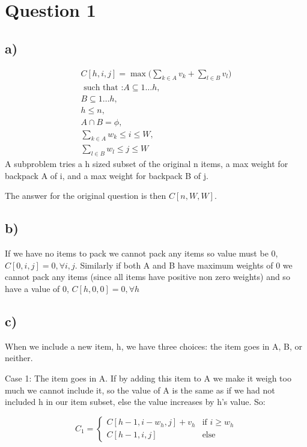 \documentclass[12pt]{article}
\begin{document}


\section*{Question 1}
\subsection*{a)}
\begin{eqnarray*}
    C[h,i,j] = \max \bigg( \displaystyle\sum_{k \in A} v_k + \displaystyle\sum_{l \in B} v_l  \bigg)\\
    \text { such that :} A \subseteq {1 \dots h} \text{,  }\\
    B \subseteq {1 \dots h},\\
    h \leq n, \\
    A \cap B = \phi, \\
    \displaystyle\sum_{k \in A} w_k \leq i \leq W, \\
    \displaystyle\sum_{l \in B} w_l \leq j \leq W
\end{eqnarray*}
A subproblem tries a h sized subset of the original n items, a max weight for backpack A of i, and a max weight for backpack B of j.

The answer for the original question is then $C[n,W,W]$.

\subsection*{b)}
If we have no items to pack we cannot pack any items so value must be 0, $C[0,i,j] = 0, \forall i,j$. Similarly if both A and B have maximum weights of 0 we cannot pack any items (since all items have positive non zero weights) and so have a value of 0, $C[h,0,0] = 0, \forall h$

\subsection*{c)}
When we include a new item, h, we have three choices: the item goes in A, B, or neither.

Case 1: The item goes in A. If by adding this item to A we make it weigh too much we cannot include it, so the value of A is the same as if we had not included h in our item subset, else the value increases by h's value. So:
\begin{center}
\[
 C_1 =
  \begin{cases}
   C[h-1, i - w_h, j]  + v_h & \text{if } i \geq w_h \\
   C[h-1, i, j]       & \text{else}
  \end{cases}
\]
\end{center}
\end{document}

